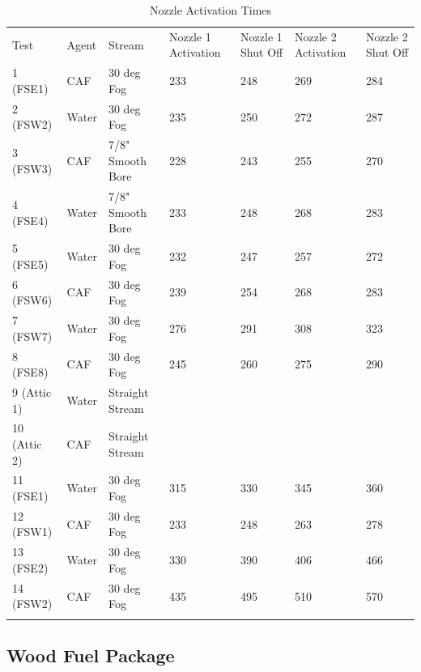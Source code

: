 \documentclass[12pt,oneside]{book}
\begin{document}
\begin{table}
	\centering
	\caption{Nozzle Activation Times}
	\begin{tabular}{lllllll}
		\hline\noalign{\smallskip}
		Test		& Agent		& Stream				& Nozzle 1 Activation	& Nozzle 1 Shut Off		& Nozzle 2 Activation	& Nozzle 2 Shut Off \\
		\noalign{\smallskip}\hline\noalign{\smallskip}
		1 (FSE1)    &  CAF      &  30 deg Fog  	    	& 233 					& 248					& 269					& 284					\\
		2 (FSW2)   	& Water     &  30 deg Fog  	    	& 235					& 250					& 272					& 287					\\
		3 (FSW3) 	&  CAF      &  7/8" Smooth Bore     & 228					& 243 					& 255					& 270					\\
		4 (FSE4)    &  Water    &  7/8" Smooth Bore     & 233					& 248					& 268					& 283					\\
		5 (FSE5)    &  Water    &  30 deg Fog  	    	& 232					& 247					& 257					& 272					\\
		6 (FSW6)    &  CAF      &  30 deg Fog     		& 239					& 254					& 268					& 283					\\
		7 (FSW7)    &  Water    &  30 deg Fog     		& 276					& 291					& 308					& 323					\\
		8 (FSE8)    &  CAF      &  30 deg Fog     		& 245					& 260					& 275					& 290					\\
		9 (Attic 1) &  Water    &  Straight Stream     	&						&						&						&					\\
		10 (Attic 2)&  CAF      &  Straight Stream     	& 						&						&						&					\\
		11 (FSE1)   &  Water    &  30 deg Fog  	   		& 315					& 330					& 345					& 360					\\
		12 (FSW1)   &  CAF      &  30 deg Fog  	   		& 233					& 248					& 263					& 278					\\
		13 (FSE2)   &  Water    &  30 deg Fog  	   		& 330					& 390					& 406					& 466					\\
		14 (FSW2)   &  CAF      &  30 deg Fog  	  		& 435					& 495					& 510					& 570					\\
		\noalign{\smallskip}\hline
	\end{tabular}
	\label{tab:Nozzle_Activation_Times}
\end{table}
	
\subsection{Wood Fuel Package}
\label{subsec:Wood_Fuel_Package}
\end{document}

